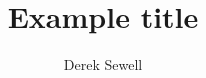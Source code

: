 \documentclass{lincoln}
\begin{document}
\title{Example title}
\author{Derek Sewell}
\maketitle
\thispagestyle{fancy}
\tableofcontents


\clearpage
\printbibliography
\end{document}
